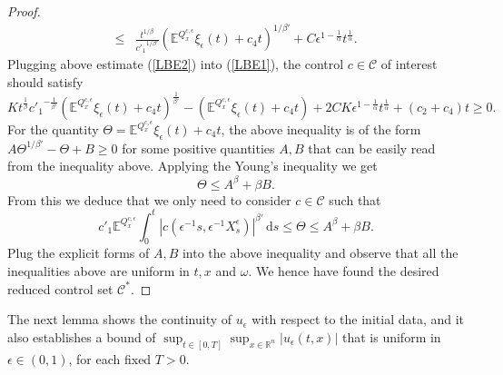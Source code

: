 \documentclass[11pt,reqno]{amsart}
\theoremstyle{definition}
\theoremstyle{remark}
\numberwithin{equation}{section}
\newcommand{\eps}{\epsilon}
\newcommand{\R}{{\mathbb{R}}}
\begin{document}
\begin{proof}
\begin{align}
    \leq & \frac{t^{1/\beta}}{{c'_1}^{1/\beta'}} \left(\mathbb{E}^{Q^{c,\epsilon}_{x}}\xi_{\epsilon}(t) + c_4 t \right)^{1/\beta'}  + C\epsilon^{1-\frac{1}{\alpha}} t^{\frac{1}{\alpha}}.
\end{align}
Plugging above estimate (\ref{LBE2}) into (\ref{LBE1}), the control $c\in\mathscr{C}$ of interest should satisfy
\begin{equation}
    K t^{\frac{1}{\beta}} {c'_1}^{-\frac{1}{\beta'}}(\mathbb{E}^{Q^{c,\epsilon}_{x}}\xi_{\epsilon}(t) + c_4 t) ^{\frac{1}{\beta'}}  - (\mathbb{E}^{Q^{c,\epsilon}_{x}}\xi_{\epsilon}(t) + c_4 t) + 2C K\epsilon^{1-\frac{1}{\alpha}} t^{\frac{1}{\alpha}} + (c_2+c_4)t  \geq 0.
\end{equation}
For the quantity $\Theta = \mathbb{E}^{Q^{c,\eps}_x} \xi_\eps(t) + c_4t$, the above inequality is of the form $A\Theta^{1/\beta'} - \Theta + B\ge 0$ for some positive quantities $A,B$ that can be easily read from the inequality above. Applying the Young's inequality we get
\begin{equation*}
    \Theta \le A^{\beta} + \beta B.
\end{equation*}
From this we deduce that we only need to consider $c\in \mathscr{C}$ such that
\begin{equation*}
c'_1 \mathbb{E}^{Q^{c,\eps}_x}\int_0^t |c(\eps^{-1}s,\eps^{-1}X^\eps_s)|^{\beta'}\,\mathrm{d}s \le \Theta \le A^\beta + \beta B.
\end{equation*}
Plug the explicit forms of $A,B$ into the above inequality and observe that all the inequalities above are uniform in $t,x$ and $\omega$. We hence have found the desired reduced control set $\mathscr{C}^*$.
\end{proof}

The next lemma shows the continuity of $u_{\epsilon}$ with respect to the initial data, and it also establishes a bound of $\sup_{t\in [0,T]} \sup_{x\in \R^n}|u_\eps(t,x)|$ that is uniform in $\eps \in (0,1)$, for each fixed $T>0$. 
\end{document}
